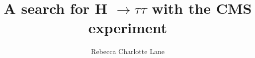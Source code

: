 \documentclass{mythesis}
\title{A search for H $\rightarrow\tau\tau$ with the CMS experiment}
\author{Rebecca Charlotte Lane}
\begin{document}
\begin{frontmatter}
  
\end{frontmatter}

\begin{mainmatter}
  
  
  
  
  
\end{mainmatter}

%  

\begin{backmatter}
  
\end{backmatter}

\end{document}
